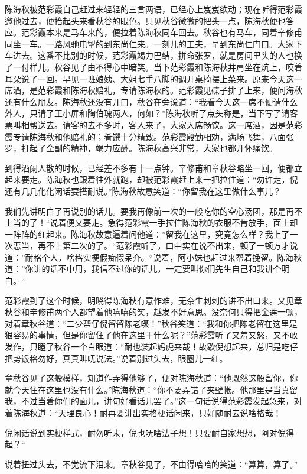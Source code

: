 \documentclass[12pt,UTF8]{ctexbook}
\begin{document}
{{{陈海秋被范彩霞自己赶过来轻轻的三言两语，已经心上岌岌欲动；现在听得范彩霞邀他过去，便抬起头来看秋谷的眼色。只见秋谷微微的把头一点，陈海秋便也答应。范彩霞本来是马车来的，便拉着陈海秋同车回去。秋谷也有马车，同着辛修甫同坐一车。一路风驰电掣的到东尚仁来。一刻儿的工夫，早到东尚仁门口。大家下车进去。这番不比别的时候，范彩霞竭力巴结，拼命张罗，就是房间里头的人也换了一付样儿。秋谷见了由不得心中暗笑。当下范彩霞和陈海秋并肩坐在炕上，咬着耳朵说了一回。早见一班娘姨、大姐七手八脚的调开桌椅摆上菜来。原来今天这一席酒，是范彩霞和陈海秋赔礼，专请陈海秋的。范彩霞见碟子排了上来，便问海秋还有什么朋友。陈海秋还没有开口，秋谷在旁说道：“我看今天这一席不便请什么外人，只请了王小屏和陶伯瑰两人，何如？”陈海秋听了点头称是，当下写了请客票叫相帮送去。请客的去不多时，客人来了，大家入席畅饮。这一席酒，因是范彩霞专请陈海秋和他赔礼的；肴馔十分精致。范彩霞殷勤相劝，满场飞舞，八面张罗，打起了全副的精神，竭力应酬。陈海秋高兴非常，大家也都开怀痛饮。

到得酒阑人散的时候，已经差不多有十一点钟。辛修甫和章秋谷略坐一回，便都立起来要走。陈海秋也跟着往外就跑，却被范彩霞赶上来一把拉住道：“勿许走，倪还有几几化化闲话要搭耐说。”陈海秋故意笑道：“你留我在这里做什么事儿？

我们先讲明白了再说别的话儿。要我再像前一次的一般吃你的空心汤团，那是再不上当的了！“说着便又要走。急得范彩霞一手拉住陈海秋的衣服不肯放手，面上却一阵阵的红起来。陈海秋故意逼着问他道：”留我在这里，究竟怎么样？我上了一次恶当，再不上第二次的了。“范彩霞听了，口中实在说不出来，顿了一顿方才说道：”耐格个人，啥格实梗假痴假呆介。“说着，阿小妹也赶过来帮着挽留。陈海秋道：”你讲的话不中用，我信不过你的话儿，一定要叫你们先生自己和我讲个明白。“

范彩霞到了这个时候，明晓得陈海秋有意作难，无奈生刺刺的讲不出口来。又见章秋谷和辛修甫两个人都望着他嘻嘻的笑，越发不好意思。没奈何只得把金莲一顿，对着章秋谷道：“二少帮仔倪留留陈老嗫！”秋谷笑道：“我和你把陈老留在这里是狠容易的事情，但是你留住了他在这里干什么呢？”范彩霞听了又羞又怒，又不敢发作，只瞪了秋谷一个白眼道：“耐也装起妈虎来哉！故歇倪想起来，总归是吃仔把势饭格勿好，真真叫呒说法。”说着别过头去，眼圈儿一红。

章秋谷见了这般模样，知道作弄得他够了，便对陈海秋道：“他既然这般留你，你就今天住在这里也没有什么。”陈海秋道：“你不要弄错了夹壁帐。他那里是当真留我，不过当着你们的面儿，讲句好看话儿罢了。”这一句话说得范彩霞发起急来，对着陈海秋道：“天理良心！耐再要讲出实格梗话闲来，只好随耐去说啥格哉！

倪闲话说到实梗样式，耐勿听末，倪也呒啥法子想！只要耐自家想想，阿对倪得起？“

说着扭过头去，不觉流下泪来。章秋谷见了，不由得哈哈的笑道：“算算，算了。”

}}}
\end{document}
